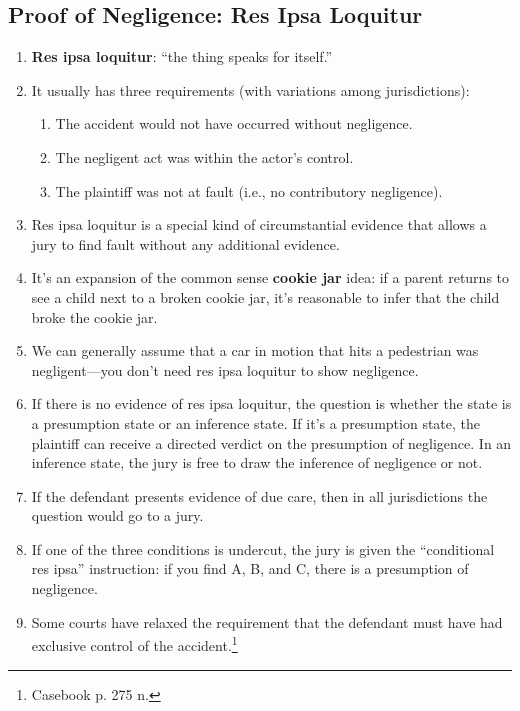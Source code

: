 \subsection{Proof of Negligence: Res Ipsa Loquitur}

\begin{enumerate}
    \item \textbf{Res ipsa loquitur}: ``the thing speaks for itself.''
    \item It usually has three requirements (with variations among 
    jurisdictions):
    \begin{enumerate}
        \item The accident would not have occurred without negligence.
        \item The negligent act was within the actor's control.
        \item The plaintiff was not at fault (i.e., no contributory 
        negligence).
    \end{enumerate}
    \item Res ipsa loquitur is a special kind of circumstantial evidence that 
    allows a jury to find fault without any additional evidence.
    \item It's an expansion of the common sense \textbf{cookie jar} idea: if a 
    parent returns to see a child next to a broken cookie jar, it's reasonable 
    to infer that the child broke the cookie jar.
    \item We can generally assume that a car in motion that hits a pedestrian 
    was negligent---you don't need res ipsa loquitur to show negligence.
    \item If there is no evidence of res ipsa loquitur, the question is 
    whether the state is a presumption state or an inference state. If it's a 
    presumption state, the plaintiff can receive a directed verdict on the 
    presumption of negligence.  In an inference state, the jury is free to 
    draw the inference of negligence or not.
    \item If the defendant presents evidence of due care, then in all 
    jurisdictions the question would go to a jury.
    \item If one of the three conditions is undercut, the jury is given the 
    ``conditional res ipsa'' instruction: if you find A, B, and C, there is a 
    presumption of negligence.
    \item Some courts have relaxed the requirement that the defendant must 
    have had exclusive control of the accident.\footnote{Casebook p. 275 n. 
}
\end{enumerate}
